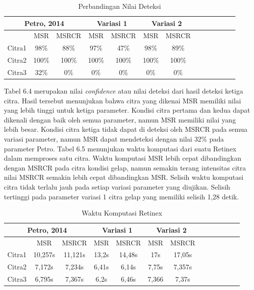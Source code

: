 \begin{table}[H]
	\caption{Perbandingan Nilai Deteksi}
	\vspace{0cm}
	\centering
	\begin{tabular}{|c|c|c|c|c|c|c|c|c|c|c|c|c|}
	\hline
	\multicolumn{3}{|c|}{Petro, 2014} &\multicolumn{2}{|c|}{Variasi 1}&\multicolumn{2}{|c|}{Variasi 2} \\
	\hline   &MSR &MSRCR &MSR&MSRCR&MSR&MSRCR\\
	\hline  Citra1 & 98\%&88\%&97\% &47\% &98\% &89\% \\
	\hline   Citra2 & 100\%&100\% &100\% &100\% &100\% &100\%\\
	\hline Citra3 & 32\%& 0\% & 0\%&0\% &0\% &0\%\\
	\hline
	\end{tabular}
\end{table}
Tabel 6.4 merupakan nilai \textit{confidence} atau nilai deteksi dari hasil deteksi ketiga citra. Hasil tersebut menunjukan bahwa citra yang dikenai MSR memiliki nilai yang lebih tinggi untuk ketiga parameter. Kondisi citra pertama dan kedua dapat dikenali dengan baik oleh semua parameter, namun MSR memiliki nilai yang lebih besar. Kondisi citra ketiga tidak dapat di deteksi oleh MSRCR pada semua variasi parameter, namun MSR dapat mendeteksi dengan nilai 32\% pada parameter Petro. Tabel 6.5 menunjukan waktu komputasi dari suatu Retinex dalam memproses satu citra. Waktu komputasi MSR lebih cepat dibandingkan dengan MSRCR pada citra kondisi gelap, namun semakin terang intensitas citra nilai MSRCR semakin lebih cepat dibandingkan MSR. Selisih waktu komputasi citra tidak terlalu jauh pada setiap variasi parameter yang diujikan. Selisih tertinggi pada parameter variasi 1 citra gelap yang memiliki selisih 1,28 detik. 
\begin{table}[H]
	\caption{Waktu Komputasi Retinex}
	\vspace{0cm}
	\centering
	\begin{tabular}{|c|c|c|c|c|c|c|c|c|c|c|c|c|}
		\hline
		\multicolumn{3}{|c|}{Petro, 2014} &\multicolumn{2}{|c|}{Variasi 1}&\multicolumn{2}{|c|}{Variasi 2} \\
		\hline   &MSR &MSRCR &MSR&MSRCR&MSR&MSRCR\\
		\hline   Citra1 & 10,257s&11,121s&13,2s &14,48s &17s &17,05s \\
		\hline   Citra2 & 7,172s&7,234s &6,41s &6,14s &7,75s &7,357s\\
		\hline Citra3 & 6,795s& 7,367s &6,2s &6,46s &7,366 &7,37s\\
		\hline
	\end{tabular}
\end{table}
